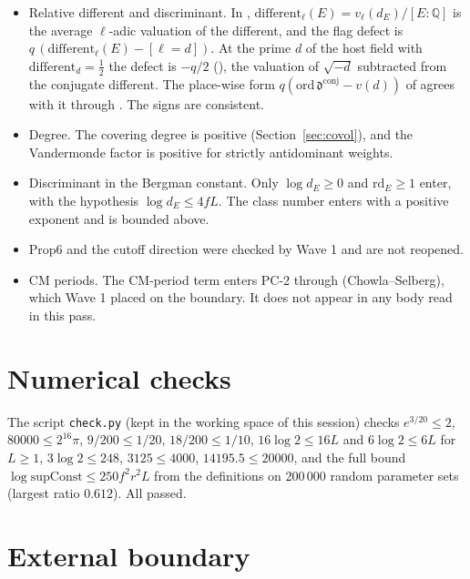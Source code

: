 \documentclass[11pt]{article}
\theoremstyle{remark}
\begin{document}
\begin{itemize}[nosep]
\item Relative different and discriminant. In , $\mathrm{different}_\ell(E)=v_\ell(d_E)/[E:\mathbb Q]$ is the average $\ell$-adic valuation of the different, and the flag defect is $q\,(\mathrm{different}_\ell(E)-[\ell=d])$. At the prime $d$ of the host field with $\mathrm{different}_d=\frac12$ the defect is $-q/2$ (), the valuation of $\sqrt{-d}$ subtracted from the conjugate different. The place-wise form $q(\mathrm{ord}\,\mathfrak d^{\mathrm{conj}}-v(d))$ of  agrees with it through . The signs are consistent.
\item Degree. The covering degree is positive (Section~\ref{sec:covol}), and the Vandermonde factor is positive for strictly antidominant weights.
\item Discriminant in the Bergman constant. Only $\log d_E\ge0$ and $\mathrm{rd}_E\ge1$ enter, with the hypothesis $\log d_E\le4fL$. The class number enters with a positive exponent and is bounded above.
\item Prop6 and the cutoff direction were checked by Wave 1 and are not reopened.
\item CM periods. The CM-period term enters PC-2 through  (Chowla--Selberg), which Wave 1 placed on the boundary. It does not appear in any body read in this pass.
\end{itemize}

\section{Numerical checks}\label{sec:numerics}

The script \texttt{check.py} (kept in the working space of this session) checks $e^{3/20}\le2$, $80000\le2^{16}\pi$, $9/200\le1/20$, $18/200\le1/10$, $16\log2\le16L$ and $6\log2\le6L$ for $L\ge1$, $3\log2\le248$, $3125\le4000$, $14195.5\le20000$, and the full bound $\log\mathrm{supConst}\le250f^2r^2L$ from the definitions on 200\,000 random parameter sets (largest ratio $0.612$). All passed.

\section{External boundary}\label{sec:boundary}
\end{document}
